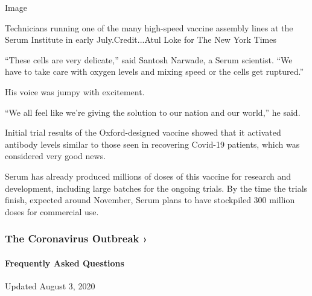 Image

Technicians running one of the many high-speed vaccine assembly lines at
the Serum Institute in early July.Credit...Atul Loke for The New York
Times

``These cells are very delicate,'' said Santosh Narwade, a Serum
scientist. ``We have to take care with oxygen levels and mixing speed or
the cells get ruptured.''

His voice was jumpy with excitement.

``We all feel like we're giving the solution to our nation and our
world,'' he said.

Initial trial results of the Oxford-designed vaccine showed that it
activated antibody levels similar to those seen in recovering Covid-19
patients, which was considered very good news.

Serum has already produced millions of doses of this vaccine for
research and development, including large batches for the ongoing
trials. By the time the trials finish, expected around November, Serum
plans to have stockpiled 300 million doses for commercial use.

\href{https://www.nytimes.com/news-event/coronavirus?action=click\&pgtype=Article\&state=default\&region=MAIN_CONTENT_3\&context=storylines_faq}{}

\hypertarget{the-coronavirus-outbreak-}{%
\subsubsection{The Coronavirus Outbreak
›}\label{the-coronavirus-outbreak-}}

\hypertarget{frequently-asked-questions}{%
\paragraph{Frequently Asked
Questions}\label{frequently-asked-questions}}

Updated August 3, 2020


